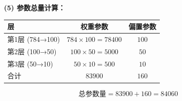 \documentclass[a4paper,11pt]{ctexart}
\begin{document}
\begin{solutionbox}[参考答案与详细解析]
    \textbf{(5) 参数总量计算：}

    \begin{center}
    \begin{tabular}{lcc}
        \toprule
        层 & 权重参数 & 偏置参数 \\
        \midrule
        第1层 (784→100) & $784 \times 100 = 78400$ & $100$ \\
        第2层 (100→50)  & $100 \times 50 = 5000$   & $50$ \\
        第3层 (50→10)   & $50 \times 10 = 500$     & $10$ \\
        \midrule
        合计 & $83900$ & $160$ \\
        \bottomrule
    \end{tabular}
    \end{center}
    \[
    \text{总参数量} = 83900 + 160 = \boxed{84060}
    \]
\end{solutionbox}
\end{document}
